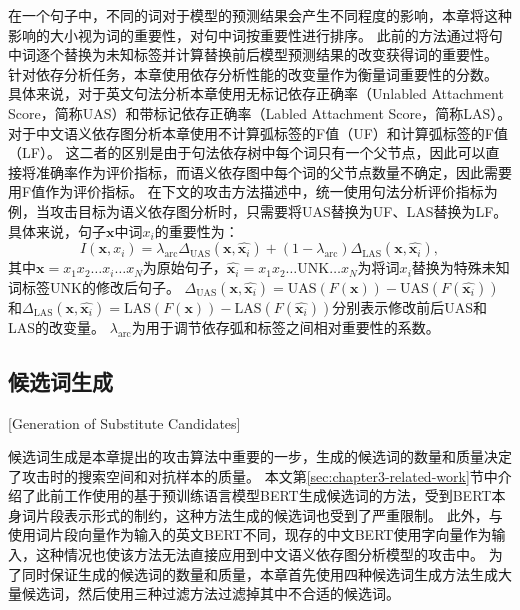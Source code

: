 在一个句子中，不同的词对于模型的预测结果会产生不同程度的影响，本章将这种影响的大小视为词的重要性，对句中词按重要性进行排序。
此前的方法通过将句中词逐个替换为未知标签并计算替换前后模型预测结果的改变获得词的重要性。\cite{li-etal-2016-visualizing,ren-etal-2019-generating}
针对依存分析任务，本章使用依存分析性能的改变量作为衡量词重要性的分数。
具体来说，对于英文句法分析本章使用无标记依存正确率（Unlabled Attachment Score，简称UAS）和带标记依存正确率（Labled Attachment Score，简称LAS）。
对于中文语义依存图分析本章使用不计算弧标签的F值（UF）和计算弧标签的F值（LF）。
这二者的区别是由于句法依存树中每个词只有一个父节点，因此可以直接将准确率作为评价指标，而语义依存图中每个词的父节点数量不确定，因此需要用F值作为评价指标。
在下文的攻击方法描述中，统一使用句法分析评价指标为例，当攻击目标为语义依存图分析时，只需要将UAS替换为UF、LAS替换为LF。
具体来说，句子$\bm{x}$中词$x_i$的重要性为：
\begin{equation}
	\label{eq:word-importance}
	I(\bm{x},x_i) = \lambda_{\text{arc}}\Delta_\text{UAS}(\bm{x},\hat{\bm{x}_i}) + (1-\lambda_{\text{arc}})\Delta_\text{LAS}(\bm{x},\hat{\bm{x}_i}),
\end{equation}
其中$\bm{x} = x_1x_2\dots x_i\dots x_N$为原始句子，$\hat{\bm{x}_i} = x_1x_2\dots \text{UNK}\dots x_N$为将词$x_i$替换为特殊未知词标签UNK的修改后句子。
$\Delta_\text{UAS}(\bm{x},\hat{\bm{x}_i}) = \text{UAS}(F(\bm{x})) - \text{UAS}(F(\hat{\bm{x}_i})) $和$\Delta_\text{LAS}(\bm{x},\hat{\bm{x}_i}) = \text{LAS}(F(\bm{x})) - \text{LAS}(F(\hat{\bm{x}_i}))$分别表示修改前后UAS和LAS的改变量。
$\lambda_{\text{arc}}$为用于调节依存弧和标签之间相对重要性的系数。


\subsection{候选词生成}[Generation of Substitute Candidates]
\label{sec:gen-cand}

候选词生成是本章提出的攻击算法中重要的一步，生成的候选词的数量和质量决定了攻击时的搜索空间和对抗样本的质量。
本文第\ref{sec:chapter3-related-work}节中介绍了此前工作使用的基于预训练语言模型BERT生成候选词的方法，受到BERT本身词片段表示形式的制约，这种方法生成的候选词也受到了严重限制。
此外，与使用词片段向量作为输入的英文BERT不同，现存的中文BERT使用字向量作为输入，这种情况也使该方法无法直接应用到中文语义依存图分析模型的攻击中。
为了同时保证生成的候选词的数量和质量，本章首先使用四种候选词生成方法生成大量候选词，然后使用三种过滤方法过滤掉其中不合适的候选词。

